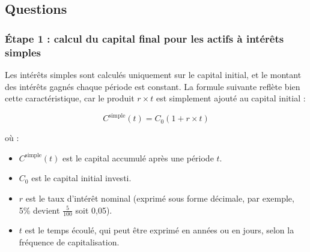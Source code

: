 \documentclass{article}
\begin{document}
    \subsection{Questions}
        \subsubsection*{Étape 1 : calcul du capital final pour les actifs à intérêts simples}
            \begin{tcolorbox}[
                colback=lightgreen, 
                colframe=lightgreen, 
                boxrule=0.5pt, 
                arc=0pt, 
                left=10pt, 
                right=10pt, 
                top=6pt, 
                bottom=6pt, 
                boxsep=2pt, 
                before upper={\faLightbulb\hspace{10pt}}
            ]
                Les intérêts simples sont calculés uniquement sur le capital initial, et le montant des intérêts gagnés chaque période est constant. La formule suivante reflète bien cette caractéristique, car le produit \( r \times t \) est simplement ajouté au capital initial :

                \[
                C^{\text{simple}}(t) = C_0 \left(1 + r \times t\right)
                \]

                où :
                \begin{itemize}
                    \item \( C^{\text{simple}}(t) \) est le capital accumulé après une période \( t \).
                    \item \( C_0 \) est le capital initial investi.
                    \item \( r \) est le taux d'intérêt nominal (exprimé sous forme décimale, par exemple, 5\% devient $\frac{5}{100}$ soit 0,05).
                    \item \( t \) est le temps écoulé, qui peut être exprimé en années ou en jours, selon la fréquence de capitalisation.
                \end{itemize}
            \end{tcolorbox}
\end{document}
